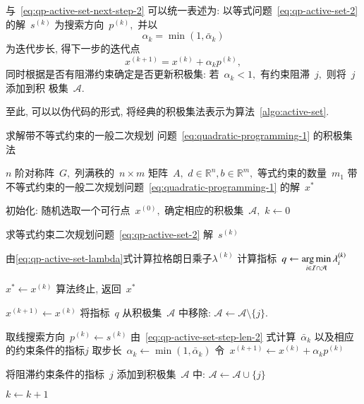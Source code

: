 与~\eqref{eq:qp-active-set-next-step-2} 可以统一表述为: 以等式问题~\eqref{eq:qp-active-set-2}
的解~${s}^{(k)}$ 为搜索方向~${p}^{(k)},$ 并以
\begin{equation}
\label{eq:qp-active-set-step-len-uniform}
\alpha_k = \min (1, \bar{\alpha}_k)
\end{equation}
为迭代步长, 得下一步的迭代点
\begin{equation}
\label{eq:qp-active-set-next-step-uniform}
{x}^{(k+1)} = {x}^{(k)} + \alpha_k {p}^{(k)},
\end{equation}
同时根据是否有阻滞约束确定是否更新积极集: 若~$\alpha_k < 1,$ 有约束阻滞~$j,$ 则将~$j$ 添加到积
极集~$\mathcal{A}.$

至此, 可以以伪代码的形式, 将经典的积极集法表示为算法~\ref{algo:active-set}.

\begingroup
\begin{algorithm}[!htbp]
\caption{求解带不等式约束的一般二次规划
问题~\eqref{eq:quadratic-programming-1} 的积极集法}\label{algo:active-set}
\begin{algorithmic}[1]
\renewcommand{\algorithmicrequire}{\textbf{输入:}}
\renewcommand{\algorithmicensure}{\textbf{输出:}}
\REQUIRE $n$ 阶对称阵~$G,$ 列满秩的~$n \times m$ 矩阵~$A,$ ${d} \in \mathbb{R}^n, {b} \in \mathbb{R}^m,$ 等式约束的数量~$m_1$
\ENSURE 带不等式约束的一般二次规划问题~\eqref{eq:quadratic-programming-1} 的解~$x^*$

\STATE 初始化: 随机选取一个可行点~${x}^{(0)},$ 确定相应的积极集~$\mathcal{A},$ $k \gets 0$\;


\STATE 求等式约束二次规划问题~\eqref{eq:qp-active-set-2} 解~${s}^{(k)}$\;


\STATE 由\eqref{eq:qp-active-set-lambda}式计算拉格朗日乘子${\lambda}^{(k)}$\;
\STATE 计算指标~$q \gets \operatorname*{arg\,min}\limits_{i \in \mathcal{I} \cap \mathcal{A}} \lambda_i^{(k)}$\;


\STATE ${x}^* \gets {x}^{(k)}$\;
\STATE 算法终止, 返回~${x}^*$\;

\ELSE

\STATE ${x}^{(k+1)} \gets {x}^{(k)}$\;
\STATE 将指标~$q$ 从积极集~$\mathcal{A}$ 中移除: $\mathcal{A} \gets \mathcal{A} \setminus \{ j \}$.

\ENDIF

\ELSE

\STATE 取线搜索方向~${p}^{(k)} \gets {s}^{(k)}$\;
\STATE 由~\eqref{eq:qp-active-set-step-len-2} 式计算~$\bar{\alpha}_k$ 以及相应的约束条件的指标$j$\;
\STATE 取步长~$\alpha_k \gets \min (1, \bar{\alpha}_k)$\;
\STATE 令~${x}^{(k+1)} \gets {x}^{(k)} + \alpha_k {p}^{(k)}$\;


\STATE 将阻滞约束条件的指标~$j$ 添加到积极集~$\mathcal{A}$ 中: $\mathcal{A} \gets \mathcal{A} \cup \{ j \}$\;

\ENDIF

\ENDIF

\STATE $k \gets k + 1$\;

\ENDWHILE
\end{algorithmic}
\end{algorithm}
\endgroup

